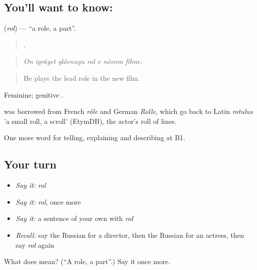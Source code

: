 \subsection*{You'll want to know: }
\textbf{} (\emph{rol}) — \textquotedblleft{}a role, a part\textquotedblright{}.

\begin{quote}
      .
\end{quote}

\begin{quote}
\emph{On igráyet glávnuyu rol v nóvom fílme.}
\end{quote}

\begin{quote}
He plays the lead role in the new film.
\end{quote}

Feminine; genitive .

\begin{cousinweb}
\emph{} was borrowed from French \emph{rôle} and German \emph{Rolle}, which go back to Latin \emph{rotulus} 'a small roll, a scroll' (EtymDB), the actor's roll of lines.
\end{cousinweb}

\begin{grammarlens}[title={What you've built}]
One more word for telling, explaining and describing at B1.
\end{grammarlens}

\subsection*{Your turn}
\begin{itemize}
\raggedright
  \item \emph{Say it:} \emph{rol}
  \item \emph{Say it:} \emph{rol}, once more
  \item \emph{Say it:} a sentence of your own with \emph{rol}
  \item \emph{Recall:} say the Russian for a director, then the Russian for an actress, then say \emph{rol} again
\end{itemize}

\begin{tcolorbox}[breakable,colback=teal!4,colframe=teal!35!black,title={Before you move on}]
What does  mean? (\textquotedblleft{}A role, a part\textquotedblright{}.) Say it once more.
\end{tcolorbox}
